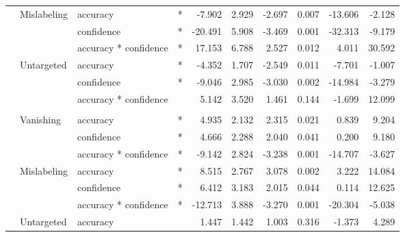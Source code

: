 \begin{longtable}[t]{llllrrrrrr}
\hspace{1em} & Mislabeling & accuracy & * & -7.902 & 2.929 & -2.697 & 0.007 & -13.606 & -2.128\\
\cmidrule{3-10}\nopagebreak
\hspace{1em} &  & confidence & * & -20.491 & 5.908 & -3.469 & 0.001 & -32.313 & -9.179\\
\cmidrule{3-10}\nopagebreak
\hspace{1em} &  & accuracy * confidence & * & 17.153 & 6.788 & 2.527 & 0.012 & 4.011 & 30.592\\
\cmidrule{2-10}\nopagebreak
\hspace{1em} & Untargeted & accuracy & * & -4.352 & 1.707 & -2.549 & 0.011 & -7.701 & -1.007\\
\cmidrule{3-10}\nopagebreak
\hspace{1em} &  & confidence & * & -9.046 & 2.985 & -3.030 & 0.002 & -14.984 & -3.279\\
\cmidrule{3-10}\nopagebreak
\hspace{1em} &  & accuracy * confidence &  & 5.142 & 3.520 & 1.461 & 0.144 & -1.699 & 12.099\\
\cmidrule{1-10}\pagebreak[0]
\addlinespace[0.3em]
\multicolumn{10}{l}{\textbf{Faster R-CNN}}\\
\hspace{1em} & Vanishing & accuracy & * & 4.935 & 2.132 & 2.315 & 0.021 & 0.839 & 9.204\\
\cmidrule{3-10}\nopagebreak
\hspace{1em} &  & confidence & * & 4.666 & 2.288 & 2.040 & 0.041 & 0.200 & 9.180\\
\cmidrule{3-10}\nopagebreak
\hspace{1em} &  & accuracy * confidence & * & -9.142 & 2.824 & -3.238 & 0.001 & -14.707 & -3.627\\
\cmidrule{2-10}\nopagebreak
\hspace{1em} & Mislabeling & accuracy & * & 8.515 & 2.767 & 3.078 & 0.002 & 3.222 & 14.084\\
\cmidrule{3-10}\nopagebreak
\hspace{1em} &  & confidence & * & 6.412 & 3.183 & 2.015 & 0.044 & 0.114 & 12.625\\
\cmidrule{3-10}\nopagebreak
\hspace{1em} &  & accuracy * confidence & * & -12.713 & 3.888 & -3.270 & 0.001 & -20.304 & -5.038\\
\cmidrule{2-10}\nopagebreak
\hspace{1em} & Untargeted & accuracy &  & 1.447 & 1.442 & 1.003 & 0.316 & -1.373 & 4.289\\

\end{longtable}
